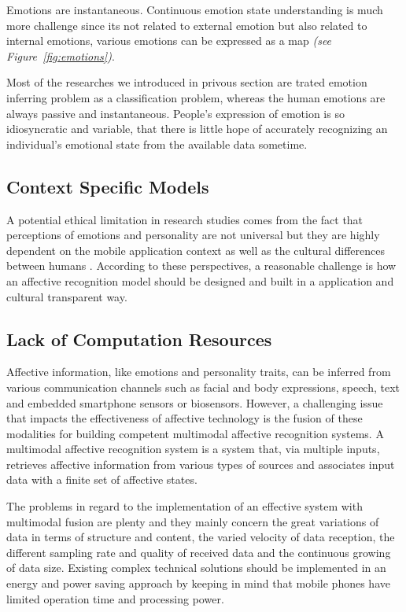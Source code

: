 Emotions are instantaneous. Continuous emotion state understanding is much more challenge since its not related to external emotion but also related to internal emotions, various emotions can be expressed as a map \textit{(see Figure~\ref{fig:emotions})}.

Most of the researches we introduced in privous section are trated emotion inferring problem as a classification problem, whereas the human emotions are always passive and instantaneous. People's expression of emotion is so idiosyncratic and variable, that there is little hope of accurately recognizing an individual’s emotional state from the available data sometime. 

\subsection{Context Specific Models}

A potential ethical limitation in research studies comes from the fact that perceptions of emotions and personality are not universal but they are highly dependent on the mobile application context \cite{Gao2012, Shah2015, bhattacharya2017predictive, Tikadar2017} as well as the cultural differences between humans \cite{mesquita1992cultural, masuda2008placing, gendron2014perceptions}. According to these perspectives, a reasonable challenge is how an affective recognition model should be designed and built in a application and cultural transparent way.

\subsection{Lack of Computation Resources}

Affective information, like emotions and personality traits, can
be inferred from various communication channels such as facial and body expressions, speech, text and embedded smartphone sensors or biosensors. 
However, a challenging issue that impacts the effectiveness of affective technology is the fusion of these modalities for building competent multimodal affective recognition systems. 
A multimodal affective recognition system is a system that, via multiple inputs, retrieves affective information from various types of sources and associates input data with a finite set of affective states\cite{ganti2011mobile}.

The problems in regard to the implementation of an effective system with multimodal fusion are plenty and they mainly concern the great variations of data in terms of structure and content, the varied velocity of data reception, the different sampling rate and quality of received data and the continuous growing of data size.
Existing complex technical solutions should be implemented in an energy and power saving approach by keeping in mind that mobile phones have limited operation time and processing power. 

